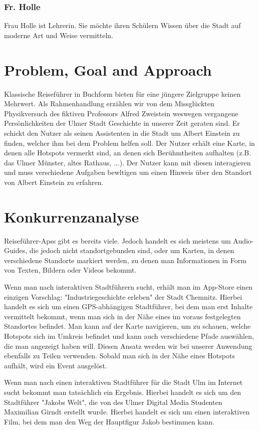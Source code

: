 \documentclass[]{hci-proposal}
\begin{document}
\subsubsection*{Fr. Holle}
Frau Holle ist Lehrerin. Sie möchte ihren Schülern Wissen über die Stadt auf moderne Art und Weise vermitteln.

\section{Problem, Goal and Approach}
Klassische Reiseführer in Buchform bieten für eine jüngere Zielgruppe keinen Mehrwert.
Als Rahmenhandlung erzählen wir von dem Missglückten Physikversuch des fiktiven Professors Alfred Zweistein weswegen vergangene Persönlichkeiten der Ulmer Stadt Geschichte in unserer Zeit geraten sind.
Er schickt den Nutzer als seinen Assistenten in die Stadt um Albert Einstein zu finden, welcher ihm bei dem Problem helfen soll.
Der Nutzer erhält eine Karte, in denen alle Hotspots vermerkt sind, an denen sich Berühmtheiten aufhalten (z.B. das Ulmer
Münster, altes Rathaus, ...). Der Nutzer kann mit diesen interagieren und muss verschiedene Aufgaben bewltigen um einen
Hinweis über den Standort von Albert Einstein zu erfahren.


\section{Konkurrenzanalyse}

Reiseführer-Apss gibt es bereits viele. Jedoch handelt es sich meistens um Audio-Guides, die jedoch nicht standortgebunden sind,
oder um Karten, in denen verschiedene Standorte markiert werden, zu denen man Informationen in Form von Texten, Bildern oder
Videos bekommt.

Wenn man nach interaktiven Stadtführern sucht, erhält man im App-Store einen einzigen Vorschlag: "Industriegeschichte erleben" der
Stadt Chemnitz. Hierbei handelt es sich um einen GPS-abhängigen Stadtführer, bei dem man erst Inhalte vermittelt bekommt, wenn man sich
in der Nähe eines im voraus festgelegten Standortes befindet. Man kann auf der Karte navigieren, um zu schauen, welche Hotspots
sich im Umkreis befindet und kann auch verschiedene Pfade auswählen, die man angezeigt haben will.
Diesen Ansatz werden wir bei unserer Anwendung ebenfalls zu Teilen verwenden. Sobald man sich in der Nähe eines Hotspots aufhält,
wird ein Event ausgelöst.

Wenn man nach einen interaktiven Stadtführer für die Stadt Ulm im Internet sucht bekommt man tatsächlich ein Ergebnis. Hierbei handelt
es sich um den Stadtführer "Jakobs Welt", die von des Ulmer Digital Media Studenten Maximilian Girndt erstellt wurde. Hierbei
handelt es sich um einen interaktiven Film, bei dem man den Weg der Hauptfigur Jakob bestimmen kann.
\end{document}
